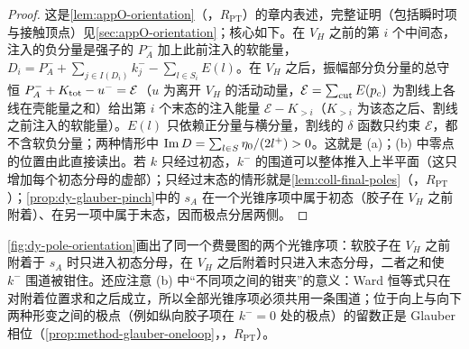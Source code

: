 \begin{proof}
这是\cref{lem:appO-orientation}（\tagR，$R_{\mathrm{PT}}$）的章内表述，完整证明（包括瞬时项与接触顶点）见\cref{sec:appO-orientation}；核心如下。在 $V_H$ 之前的第 $i$ 个中间态，注入的负分量是强子的 $P_A^-$ 加上此前注入的软能量，$D_i=P_A^-+\sum_{j\in I(D_i)}k_j^--\sum_{l\in S_i}E(l)$。在 $V_H$ 之后，振幅部分负分量的总守恒 $P_A^-+K_{\rm tot}-u^-=\mathcal E$（$u$ 为离开 $V_H$ 的活动动量，$\mathcal E=\sum_{\rm cut}E(p_c)$ 为割线上各线在壳能量之和）给出第 $i$ 个末态的注入能量 $\mathcal E-K_{>i}$（$K_{>i}$ 为该态之后、割线之前注入的软能量）。$E(l)$ 只依赖正分量与横分量，割线的 $\delta$ 函数只约束 $\mathcal E$，都不含软负分量；两种情形中 $\operatorname{Im} D=\sum_{l\in S}\eta_0/(2l^+)>0$。这就是 (a)；(b) 中零点的位置由此直接读出。若 $k$ 只经过初态，$k^-$ 的围道可以整体推入上半平面（这只增加每个初态分母的虚部）；只经过末态的情形就是\cref{lem:coll-final-poles}（\tagR，$R_{\mathrm{PT}}$）；\cref{prop:dy-glauber-pinch}中的 $s_A$ 在一个光锥序项中属于初态（胶子在 $V_H$ 之前附着）、在另一项中属于末态，因而极点分居两侧。
\end{proof}

\cref{fig:dy-pole-orientation}画出了同一个费曼图的两个光锥序项：软胶子在 $V_H$ 之前附着于 $s_A$ 时只进入初态分母，在 $V_H$ 之后附着时只进入末态分母，二者之和使 $k^-$ 围道被钳住。还应注意 (b) 中“不同项之间的钳夹”的意义：Ward 恒等式只在对附着位置求和之后成立，所以全部光锥序项必须共用一条围道；位于向上与向下两种形变之间的极点（例如纵向胶子项在 $k^-=0$ 处的极点）的留数正是 Glauber 相位（\cref{prop:method-glauber-oneloop}，\tagR，$R_{\mathrm{PT}}$）。

